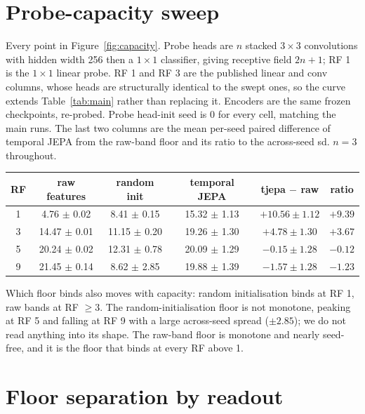 \documentclass{article}
\begin{document}
\section{Probe-capacity sweep}
\label{app:capacity}

Every point in Figure~\ref{fig:capacity}. Probe heads are $n$ stacked $3{\times}3$ convolutions with
hidden width 256 then a $1{\times}1$ classifier, giving receptive field $2n{+}1$; RF 1 is the
$1{\times}1$ linear probe. RF 1 and RF 3 are the published linear and conv columns, whose heads are
structurally identical to the swept ones, so the curve extends Table~\ref{tab:main} rather than
replacing it. Encoders are the same frozen checkpoints, re-probed. Probe head-init seed is 0 for
every cell, matching the main runs. The last two columns are the mean per-seed paired difference of
temporal JEPA from the raw-band floor and its ratio to the across-seed sd. $n{=}3$ throughout.

\begin{center}
\footnotesize
\begin{tabular}{cccccc}
\toprule
RF & raw features & random init & temporal JEPA & tjepa $-$ raw & ratio \\
\midrule
    1 & 4.76 $\pm$ 0.02 & 8.41 $\pm$ 0.15 & 15.32 $\pm$ 1.13 & $+10.56 \pm 1.12$ & $+9.39$ \\
    3 & 14.47 $\pm$ 0.01 & 11.15 $\pm$ 0.20 & 19.26 $\pm$ 1.30 & $+4.78 \pm 1.30$ & $+3.67$ \\
    5 & 20.24 $\pm$ 0.02 & 12.31 $\pm$ 0.78 & 20.09 $\pm$ 1.29 & $-0.15 \pm 1.28$ & $-0.12$ \\
    9 & 21.45 $\pm$ 0.14 & 8.62 $\pm$ 2.85 & 19.88 $\pm$ 1.39 & $-1.57 \pm 1.28$ & $-1.23$ \\
\bottomrule
\end{tabular}
\end{center}

Which floor binds also moves with capacity: random initialisation binds at RF 1, raw bands at
RF ${\geq}3$. The random-initialisation floor is not monotone, peaking at RF 5 and falling at RF 9
with a large across-seed spread ($\pm 2.85$); we do not read anything into its shape. The raw-band
floor is monotone and nearly seed-free, and it is the floor that binds at every RF above 1.

\section{Floor separation by readout}
\label{app:floors}
\end{document}

